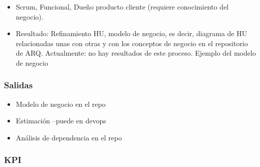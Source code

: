 \documentclass[
  paper=a4,
  ,captions=tableheading
]{scrartcl}
\providecommand{\tightlist}{%
  \setlength{\itemsep}{0pt}\setlength{\parskip}{0pt}}
\begin{document}
\begin{itemize}
\tightlist
\item
  Scrum, Funcional, Dueño producto cliente (requiere conocimiento del
  negocio).
\item
  Resultado: Refinamiento HU, modelo de negocio, es decir, diagrama de
  HU relacionadas unas con otras y con los conceptos de negocio en el
  repositorio de ARQ. Actualmente: no hay resultados de este proceso.
  Ejemplo del modelo de negocio
\end{itemize}

\subsubsection{Salidas}\label{sec:salidas-1}

\begin{itemize}
\tightlist
\item
  Modelo de negocio en el repo
\item
  Estimación --puede en devops
\item
  Análisis de dependencia en el repo
\end{itemize}

\subsubsection{KPI}\label{sec:kpi-1}
\end{document}
